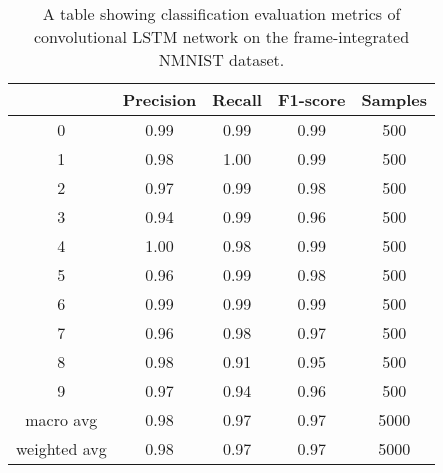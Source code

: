 \begin{table}[htb]
    \centering
    \begin{tabular}{|| c | c | c | c | c ||}
        \hline
             & Precision & Recall & F1-score & Samples \\
        \hline \hline
        0            & 0.99 & 0.99 & 0.99 & 500  \\
        \hline
        1            & 0.98 & 1.00 & 0.99 & 500  \\
        \hline
        2            & 0.97 & 0.99 & 0.98 & 500  \\
        \hline
        3            & 0.94 & 0.99 & 0.96 & 500  \\
        \hline
        4            & 1.00 & 0.98 & 0.99 & 500  \\
        \hline
        5            & 0.96 & 0.99 & 0.98 & 500  \\
        \hline
        6            & 0.99 & 0.99 & 0.99 & 500  \\
        \hline
        7            & 0.96 & 0.98 & 0.97 & 500  \\
        \hline
        8            & 0.98 & 0.91 & 0.95 & 500  \\
        \hline
        9            & 0.97 & 0.94 & 0.96 & 500  \\
        \hline
        macro avg    & 0.98 & 0.97 & 0.97 & 5000 \\
        \hline
        weighted avg & 0.98 & 0.97 & 0.97 & 5000 \\
        \hline
    \end{tabular}
    \caption{A table showing classification evaluation metrics of convolutional LSTM network on the frame-integrated NMNIST dataset.}
    \label{tab:conv_lstm_nmnist_evaluation_metrics}
\end{table}

